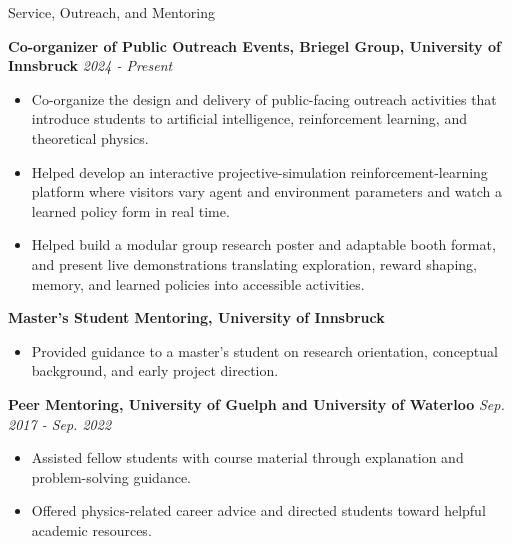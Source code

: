 \documentclass{resume} %
\begin{document}
\vspace{1em}

\begin{rSection}{Service, Outreach, and Mentoring}

{\bf Co-organizer of Public Outreach Events, Briegel Group, University of Innsbruck}
\hfill\textit{{2024 - Present}}
\begin{itemize}
\item Co-organize the design and delivery of public-facing outreach activities that introduce students to artificial intelligence, reinforcement learning, and theoretical physics.
\item Helped develop an interactive projective-simulation reinforcement-learning platform where visitors vary agent and environment parameters and watch a learned policy form in real time.
\item Helped build a modular group research poster and adaptable booth format, and present live demonstrations translating exploration, reward shaping, memory, and learned policies into accessible activities.
\end{itemize}

{\bf Master's Student Mentoring, University of Innsbruck}
\begin{itemize}
\item Provided guidance to a master's student on research orientation, conceptual background, and early project direction.
\end{itemize}

{\bf Peer Mentoring, University of Guelph and University of Waterloo}
\hfill\textit{{Sep. 2017 - Sep. 2022}}
\begin{itemize}
\item Assisted fellow students with course material through explanation and problem-solving guidance.
\item Offered physics-related career advice and directed students toward helpful academic resources.
\end{itemize}

\end{rSection}

\vspace{1em}
\end{document}
